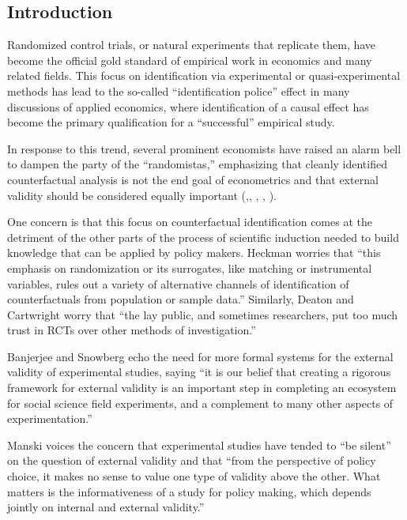 \documentclass[a4paper,12pt]{article}
\begin{document}
\subsection*{Introduction}

Randomized control trials, or natural experiments that replicate them, have become the official gold standard of empirical work in economics and many related fields. This focus on identification via experimental or quasi-experimental methods has lead to the so-called ``identification police'' effect in many discussions of applied economics, where identification of a causal effect has become the primary qualification for a ``successful'' empirical study.

In response to this trend, several prominent economists have raised an alarm bell to dampen the party of the ``randomistas,'' emphasizing that cleanly identified counterfactual analysis is not the end goal of econometrics and that external validity should be considered equally important (\cite{Shadish2002},\cite{Heckman2008}, \cite{Deaton2010}, \cite{Manski2013}, \cite{Deaton2018}). 

One concern is that this focus on counterfactual identification comes at the detriment of the other parts of the process of scientific induction needed to build knowledge that can be applied by policy makers. Heckman \parencite*{Heckman2008} worries that ``this emphasis on randomization or its surrogates, like matching or instrumental variables, rules out a variety of alternative channels of identification of counterfactuals from population or sample data.'' Similarly, Deaton and Cartwright \parencite*{Deaton2018} worry that ``the lay public, and sometimes researchers, put too much trust in RCTs over other methods of investigation.'' 

Banjerjee and Snowberg \parencite*{Snowberg2016} echo the need for more formal systems for the external validity of experimental studies, saying ``it is our belief that creating a rigorous framework for external validity is an important step in completing an ecosystem for social science field experiments, and a complement to many other aspects of experimentation.''

Manski \parencite*{Manski2013} voices the concern that experimental studies have tended to ``be silent'' on the question of external validity and that ``from the perspective of policy choice, it makes no sense to value one type of validity above the other. What matters is the informativeness of a study for policy making, which depends jointly on internal and external validity.''
\end{document}
